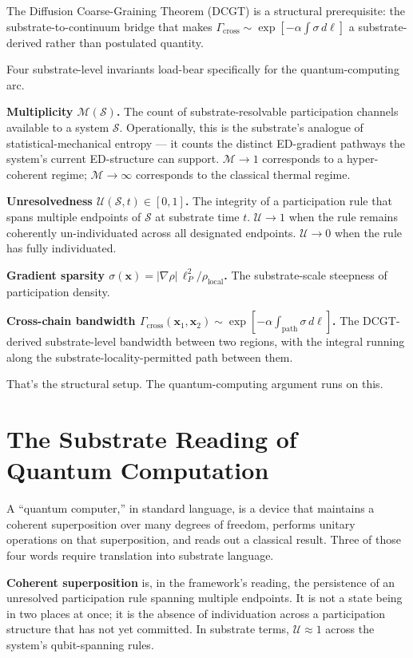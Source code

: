 \documentclass[11pt,a4paper]{article}
\begin{document}
The Diffusion Coarse-Graining Theorem (DCGT) is a structural prerequisite: the substrate-to-continuum bridge that makes $\Gamma_{\mathrm{cross}} \sim \exp[-\alpha\int\sigma\, d\ell]$ a substrate-derived rather than postulated quantity.

Four substrate-level invariants load-bear specifically for the quantum-computing arc.

\textbf{Multiplicity $\mathcal{M}(\mathcal{S})$.} The count of substrate-resolvable participation channels available to a system $\mathcal{S}$. Operationally, this is the substrate's analogue of statistical-mechanical entropy --- it counts the distinct ED-gradient pathways the system's current ED-structure can support. $\mathcal{M} \to 1$ corresponds to a hyper-coherent regime; $\mathcal{M} \to \infty$ corresponds to the classical thermal regime.

\textbf{Unresolvedness $\mathcal{U}(\mathcal{S}, t) \in [0, 1]$.} The integrity of a participation rule that spans multiple endpoints of $\mathcal{S}$ at substrate time $t$. $\mathcal{U} \to 1$ when the rule remains coherently un-individuated across all designated endpoints. $\mathcal{U} \to 0$ when the rule has fully individuated.

\textbf{Gradient sparsity $\sigma(\mathbf{x}) = |\nabla\rho|\, \ell_P^2/\rho_{\mathrm{local}}$.} The substrate-scale steepness of participation density.

\textbf{Cross-chain bandwidth $\Gamma_{\mathrm{cross}}(\mathbf{x}_1, \mathbf{x}_2) \sim \exp[-\alpha\int_{\mathrm{path}}\sigma\, d\ell]$.} The DCGT-derived substrate-level bandwidth between two regions, with the integral running along the substrate-locality-permitted path between them.

That's the structural setup. The quantum-computing argument runs on this.

\section{The Substrate Reading of Quantum Computation}

A ``quantum computer,'' in standard language, is a device that maintains a coherent superposition over many degrees of freedom, performs unitary operations on that superposition, and reads out a classical result. Three of those four words require translation into substrate language.

\textbf{Coherent superposition} is, in the framework's reading, the persistence of an unresolved participation rule spanning multiple endpoints. It is not a state being in two places at once; it is the absence of individuation across a participation structure that has not yet committed. In substrate terms, $\mathcal{U} \approx 1$ across the system's qubit-spanning rules.
\end{document}
